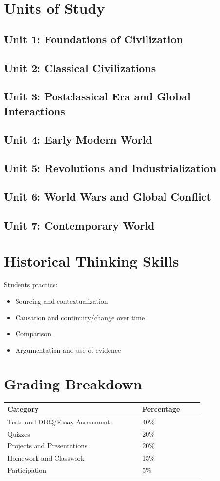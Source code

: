 \documentclass[12pt,oneside]{book}
\begin{document}
\section{Units of Study}
\subsection*{Unit 1: Foundations of Civilization}
\subsection*{Unit 2: Classical Civilizations}
\subsection*{Unit 3: Postclassical Era and Global Interactions}
\subsection*{Unit 4: Early Modern World}
\subsection*{Unit 5: Revolutions and Industrialization}
\subsection*{Unit 6: World Wars and Global Conflict}
\subsection*{Unit 7: Contemporary World}

\section{Historical Thinking Skills}
Students practice:
\begin{itemize}[leftmargin=2em]
    \item Sourcing and contextualization
    \item Causation and continuity/change over time
    \item Comparison
    \item Argumentation and use of evidence
\end{itemize}

\section{Grading Breakdown}
\begin{center}
\begin{tabular}{L{0.55\linewidth}L{0.25\linewidth}}
\toprule
\textbf{Category} & \textbf{Percentage} \\
\midrule
Tests and DBQ/Essay Assessments & 40\% \\
Quizzes & 20\% \\
Projects and Presentations & 20\% \\
Homework and Classwork & 15\% \\
Participation & 5\% \\
\bottomrule
\end{tabular}
\end{center}
\end{document}
